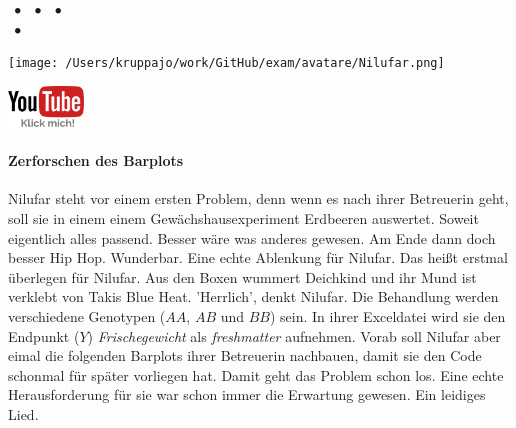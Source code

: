 \documentclass[a4paper, 9pt]{scrartcl}\usepackage[]{graphicx}\usepackage[]{xcolor}
\begin{document}
 
\ifcollection
\begin{flushright}
\tiny\vspace{-3Ex}
\textbf{\examinhaltstart}
\exammodulemathstat $\;\bullet$
\exammodulestat $\;\bullet$
\exammodulestatbbv $\;\bullet$
\exammodulestatversuch\\
\exammodulelanddaten $\;\bullet$
\exammodulebiostat
\vspace{-4Ex}
\end{flushright}
\begin{minipage}[t]{0.5\textwidth}
\texttt{[image: /Users/kruppajo/work/GitHub/exam/avatare/Nilufar.png]}
\end{minipage}
\begin{minipage}[t]{0.5\textwidth}
\hfill
\href{https://youtu.be/GNoORO7GfAE}{\includegraphics[width = 2cm]{img/youtube}}
\end{minipage}
\vspace{-3ex}
\fi



\ifcollection
\paragraph{Zerforschen des Barplots}
\fi

Nilufar steht vor einem ersten Problem, denn wenn es nach ihrer Betreuerin geht, soll sie in einem einem Gewächshausexperiment Erdbeeren auswertet. Soweit eigentlich alles passend. Besser wäre was anderes gewesen. Am Ende dann doch besser Hip Hop. Wunderbar. Eine echte Ablenkung für Nilufar. Das heißt erstmal überlegen für Nilufar. Aus den Boxen wummert Deichkind und ihr Mund ist verklebt von Takis Blue Heat. 'Herrlich', denkt Nilufar. Die Behandlung werden verschiedene Genotypen ($AA$, $AB$ und $BB$) sein. In ihrer Exceldatei wird sie den Endpunkt ($Y$) \textit{Frischegewicht} als \textit{freshmatter} aufnehmen. Vorab soll Nilufar aber eimal die folgenden Barplots ihrer Betreuerin nachbauen, damit sie den \Rlogo Code schonmal für später vorliegen hat. Damit geht das Problem schon los. Eine echte Herausforderung für sie war schon immer die Erwartung gewesen. Ein leidiges Lied.
\end{document}
